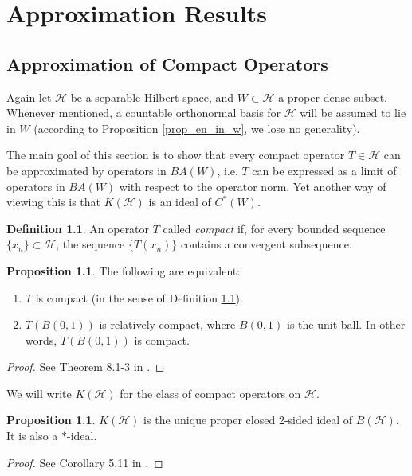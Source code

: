 \documentclass{dcthesis}
\numberwithin{equation}{section}
\numberwithin{equation}{section}
\theoremstyle{definition}
\newtheorem{proposition}[equation]{Proposition}
\newtheorem{definition}[equation]{Definition}
\begin{document}


\chapter{Approximation Results}

\section{Approximation of Compact Operators} %


Again let $\mathcal{H}$ be a separable Hilbert space, and $W\subset\mathcal{H}$ a proper dense subset. Whenever mentioned, a countable orthonormal basis for $\mathcal{H}$ will be assumed to lie in $W$ (according to Proposition \ref{prop_en_in_w}, we lose no generality).  

The main goal of this section is to show that every compact operator $T\in\mathcal{H}$ can be approximated by operators in $BA(W)$, i.e. $T$ can be expressed as a limit of operators in $BA(W)$ with respect to the operator norm. Yet another way of viewing this is that $K(\mathcal{H})$ is an ideal of $C^\ast(W)$.

\begin{definition}
\label{def_compact_operator}
	An operator $T$ called \emph{compact} if, for every bounded sequence $\{x_n\}\subset\mathcal{H}$, the sequence $\{T(x_n)\}$ contains a convergent subsequence.
\end{definition}

\begin{proposition}
\label{prop_equiv_compact_defs}
	The following are equivalent:
	\begin{enumerate}
		\item $T$ is compact (in the sense of Definition \ref{def_compact_operator}).
		\item $T(B(0,1))$ is relatively compact, where $B(0,1)$ is the unit ball. In other words, $\overline{T(B(0,1))}$ is compact.
	\end{enumerate}
\end{proposition}
\begin{proof}
	See Theorem 8.1-3 in \cite{kreyszig_1989}.
\end{proof}

We will write $K(\mathcal{H})$ for the class of compact operators on $\mathcal{H}$.

\begin{proposition}
\label{prop_compact_ideal}
	$K(\mathcal{H})$ is the unique proper closed 2-sided ideal of $B(\mathcal{H})$. It is also a $\ast$-ideal.
\end{proposition}
\begin{proof}
	See Corollary 5.11 in \cite{douglas_1998}.
\end{proof}
\end{document}
